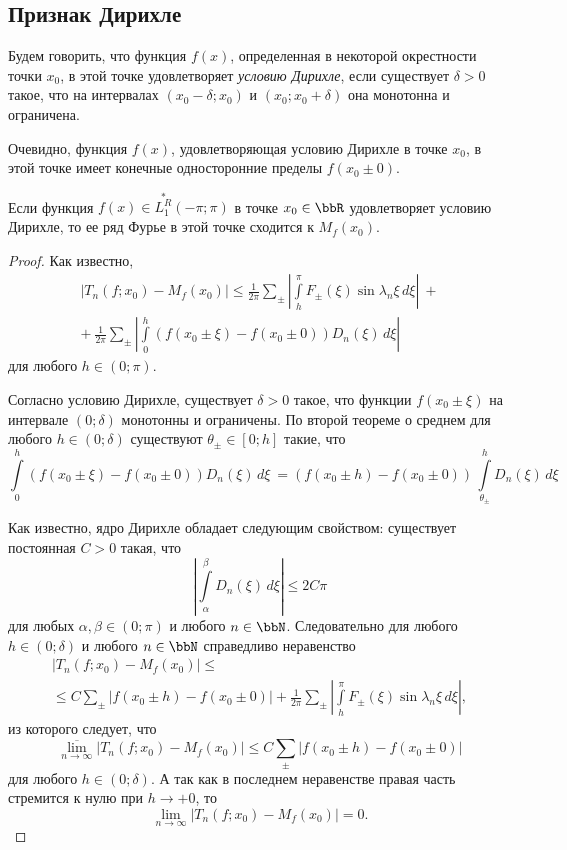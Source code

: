 
\subsection{Признак Дирихле}
Будем говорить, что функция $f(x)$, определенная в некоторой окрестности точки $x_0$, в этой точке удовлетворяет \textit{условию Дирихле}, если существует $\delta > 0$ такое, что на интервалах $(x_0 - \delta;x_0)$ и $(x_0;x_0 + \delta)$ она монотонна и ограничена.

Очевидно, функция $f(x)$, удовлетворяющая условию Дирихле в точке $x_0$, в этой точке имеет конечные односторонние пределы $f(x_0\pm 0)$.
\begin{thm} \label{ch17thm5}
Если функция $f(x) \in \overset{*}{L^{R}_1}(-\pi;\pi)$ в точке $x_0 \in \bbR$ удовлетворяет условию Дирихле, то ее ряд Фурье в этой точке сходится к $M_f(x_0)$.
\end{thm}
\begin{proof}
Как известно,
\begin{multline*}
|T_n(f; x_0) - M_f(x_0)| \le \frac{1}{2\pi} \sum_{\pm} \left|\int\limits_{h}^{\pi} F_{\pm}(\xi) \sin{\lambda_n \xi} \,d\xi \right|\ +\\
+\ \frac{1}{2\pi} \sum_{\pm} \left|\int\limits_{0}^{h} (f(x_0\pm \xi) - f(x_0\pm 0))D_n(\xi) \,d\xi \right|
\end{multline*}
для любого $h \in (0;\pi)$.

Согласно условию Дирихле, существует $\delta > 0$ такое, что функции $f(x_0\pm \xi)$ на интервале $(0;\delta)$ монотонны и ограничены. По второй теореме о среднем для любого $h \in (0;\delta)$ существуют $\theta_{\pm} \in [0;h]$ такие, что
$$
\int\limits_{0}^{h} (f(x_0\pm \xi) - f(x_0\pm 0))D_n(\xi) \,d\xi\ = (f(x_0\pm h) - f(x_0\pm 0))\, \int\limits_{\theta_{\pm}}^{h} D_n(\xi)\,d\xi
$$

Как известно, ядро Дирихле обладает следующим свойством: существует постоянная $C > 0$ такая, что
$$
\left|\int\limits_{\alpha}^{\beta} D_n(\xi)\,d\xi\right| \le 2C\pi
$$
для любых $\alpha, \beta \in (0;\pi)$ и любого $n \in \bbN$. Следовательно для любого $h \in (0;\delta)$ и любого $n \in \bbN$ справедливо неравенство
\begin{multline*}
|T_n(f; x_0) - M_f(x_0)| \le\\
\le C\sum_{\pm}|f(x_0\pm h) - f(x_0\pm 0)| + \frac{1}{2\pi} \sum_{\pm} \left|\int\limits_{h}^{\pi} F_{\pm}(\xi) \sin{\lambda_n \xi} \,d\xi \right|,
\end{multline*}
из которого следует, что
$$
\overline{\lim\limits_{n \to \infty}}|T_n(f; x_0) - M_f(x_0)| \le C\sum_{\pm}|f(x_0\pm h) - f(x_0\pm 0)|
$$
для любого $h \in (0;\delta)$. А так как в последнем неравенстве правая часть стремится к нулю при $h \to +0$, то
$$
\lim\limits_{n \to \infty}|T_n(f; x_0) - M_f(x_0)| = 0.
$$
\end{proof}

